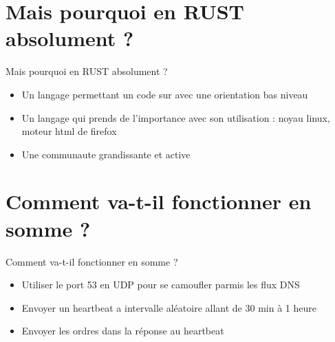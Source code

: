 \documentclass{beamer}
\begin{document}
\section{Mais pourquoi en RUST absolument ?}
  \begin{frame}{Mais pourquoi en RUST absolument ?}
  \begin{itemize}
	\item Un langage permettant un code sur avec une orientation bas niveau
	\item Un langage qui prends de l'importance avec son utilisation : noyau linux, moteur html de firefox
	\item Une communaute grandissante et active
  \end{itemize}
  \end{frame}

\section{Comment va-t-il fonctionner en somme ?}
  \begin{frame}{Comment va-t-il fonctionner en somme ?}
  \begin{itemize}
	\item Utiliser le port 53 en UDP pour se camoufler parmis les flux DNS
	\item Envoyer un heartbeat a intervalle aléatoire allant de 30 min à 1 heure
	\item Envoyer les ordres dans la réponse au heartbeat
  \end{itemize}
  \end{frame}
\end{document}
